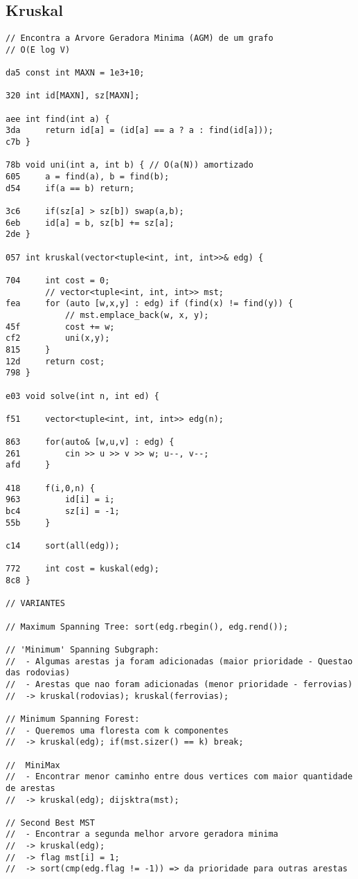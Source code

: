 \documentclass[11pt, a4paper, twoside]{article}
\begin{document}
\subsection{Kruskal}
\begin{lstlisting}
// Encontra a Arvore Geradora Minima (AGM) de um grafo
// O(E log V)

da5 const int MAXN = 1e3+10;

320 int id[MAXN], sz[MAXN];

aee int find(int a) { 
3da     return id[a] = (id[a] == a ? a : find(id[a]));
c7b }

78b void uni(int a, int b) { // O(a(N)) amortizado
605     a = find(a), b = find(b);
d54     if(a == b) return;
    
3c6     if(sz[a] > sz[b]) swap(a,b);
6eb     id[a] = b, sz[b] += sz[a];
2de }

057 int kruskal(vector<tuple<int, int, int>>& edg) {
    	
704 	int cost = 0;
    	// vector<tuple<int, int, int>> mst;
fea 	for (auto [w,x,y] : edg) if (find(x) != find(y)) {
    		// mst.emplace_back(w, x, y);
45f 		cost += w; 
cf2 		uni(x,y);
815 	}
12d 	return cost;
798 }

e03 void solve(int n, int ed) {
    
f51 	vector<tuple<int, int, int>> edg(n);
    
863 	for(auto& [w,u,v] : edg) {
261 		cin >> u >> v >> w; u--, v--;
afd 	}
    
418 	f(i,0,n) {
963 		id[i] = i;
bc4 		sz[i] = -1;
55b 	}
    	
c14 	sort(all(edg));
    
772 	int cost = kuskal(edg);
8c8 }

// VARIANTES

// Maximum Spanning Tree: sort(edg.rbegin(), edg.rend());

// 'Minimum' Spanning Subgraph:
//	- Algumas arestas ja foram adicionadas (maior prioridade - Questao das rodovias)
//	- Arestas que nao foram adicionadas (menor prioridade - ferrovias)
//	-> kruskal(rodovias); kruskal(ferrovias);

// Minimum Spanning Forest:
// 	- Queremos uma floresta com k componentes
// 	-> kruskal(edg); if(mst.sizer() == k) break;

//  MiniMax
//	- Encontrar menor caminho entre dous vertices com maior quantidade de arestas
//	-> kruskal(edg); dijsktra(mst);

// Second Best MST
// 	- Encontrar a segunda melhor arvore geradora minima
// 	-> kruskal(edg);
// 	-> flag mst[i] = 1;
// 	-> sort(cmp(edg.flag != -1)) => da prioridade para outras arestas
\end{lstlisting}
\end{document}
